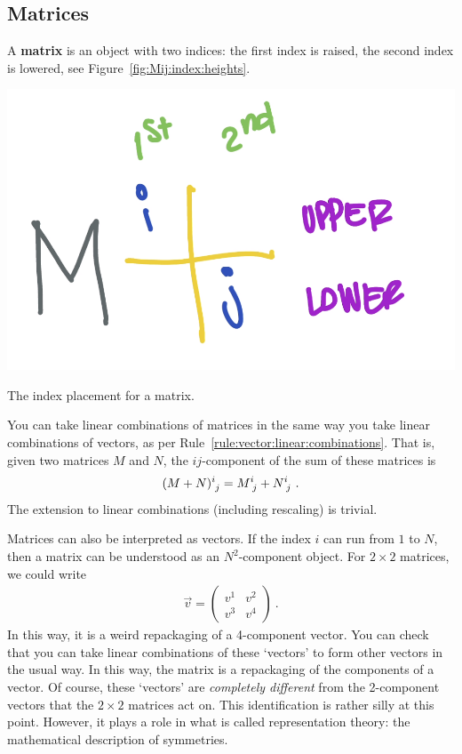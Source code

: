 \subsection{Matrices}

A \textbf{matrix} is an object with two indices: the first index is raised, the second index is lowered, see Figure~\ref{fig:Mij:index:heights}.
\begin{marginfigure}%
    \includegraphics[width=.7\textwidth]{figures/Mij_indices.png}
    \caption{The index placement for a matrix.}
    \label{fig:Mij:index:heights}
\end{marginfigure}
You can take linear combinations of matrices in the same way you take linear combinations of vectors, as per Rule~\ref{rule:vector:linear:combinations}. That is, given two matrices $M$ and $N$, the $ij$-component of the sum of these matrices is
\begin{align}
    (M+N)\aij{i}{j} = M\aij{i}{j} + N\aij{i}{j} \ .
\end{align}
The extension to linear combinations (including rescaling) is trivial.
\begin{example}
Matrices can also be interpreted as vectors. If the index $i$ can run from $1$ to $N$, then a matrix can be understood as an $N^2$-component object. For $2\times 2$ matrices, we could write
\begin{align}
    \vec{v} = 
    \begin{pmatrix}
        v^1 & v^2 \\
        v^3 & v^4
    \end{pmatrix} \ .
\end{align}
In this way, it is a weird repackaging of a 4-component vector. You can check that you can take linear combinations of these `vectors' to form other vectors in the usual way. In this way, the matrix is a repackaging of the components of a vector. Of course, these `vectors' are \emph{completely different} from the 2-component vectors that the $2\times 2$ matrices act on. This identification is rather silly at this point. However, it plays a role in what is called representation theory: the mathematical description of symmetries.
\end{example}

